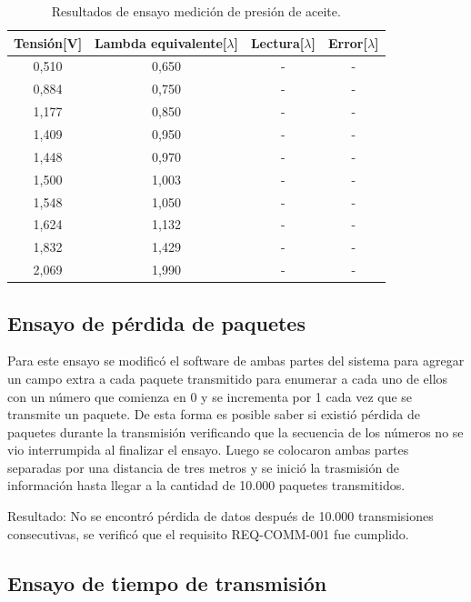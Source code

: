 \begin{table}[htpb]
	\centering
	\caption{Resultados de ensayo medición de presión de aceite.}
	\centering
	\begin{tabular}{c c c c}    
		\toprule
		\textbf{Tensión[V]} & \textbf{Lambda equivalente[$\lambda$]} & \textbf{Lectura[$\lambda$]} & \textbf{Error[$\lambda$]} \\
		\midrule
		0,510		&   0,650 & - & - \\
		0,884		&   0,750 & - & - \\
		1,177		&   0,850 & - & - \\
		1,409		&   0,950 & - & - \\
		1,448		&   0,970 & - & - \\
		1,500		&   1,003 & - & - \\
		1,548		&   1,050 & - & - \\
		1,624		&   1,132 & - & - \\
		1,832		&   1,429 & - & - \\
		2,069		&   1,990 & - & - \\
		\bottomrule
	\end{tabular}
	\label{tab:ensayo-o2}
\end{table}

\subsection{Ensayo de pérdida de paquetes}

Para este ensayo se modificó el software de ambas partes del sistema para agregar un campo extra a cada paquete transmitido para enumerar a cada uno de ellos con un número que comienza en 0 y se incrementa por 1 cada vez que se transmite un paquete. De esta forma es posible saber si existió pérdida de paquetes durante la transmisión verificando que la secuencia de los números no se vio interrumpida al finalizar el ensayo. Luego se colocaron ambas partes separadas por una distancia de tres metros y se inició la trasmisión de información hasta llegar a la cantidad de 10.000 paquetes transmitidos. 

Resultado: No se encontró pérdida de datos después de 10.000 transmisiones consecutivas, se verificó que el requisito REQ-COMM-001 fue cumplido.

\subsection{Ensayo de tiempo de transmisión}

